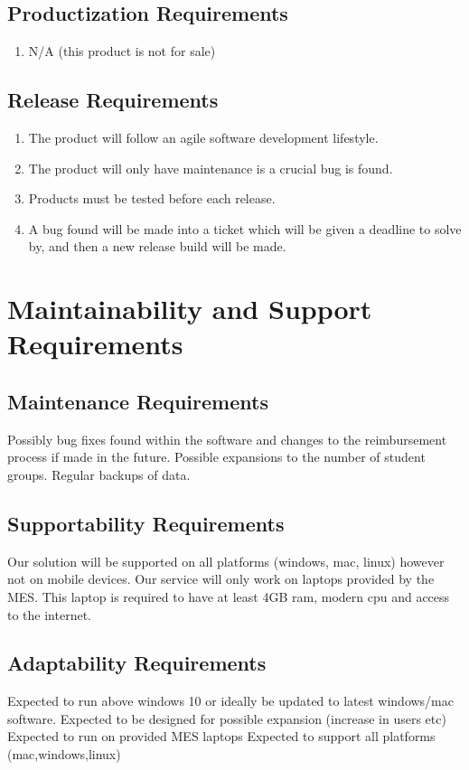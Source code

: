 \documentclass[12pt]{article}
\begin{document}
\subsection{Productization Requirements}
\begin{enumerate}
  \item N/A (this product is not for sale) 
\end{enumerate}
\subsection{Release Requirements}
\begin{enumerate}
  \item The product will follow an agile software development lifestyle.
  \item The product will only have maintenance is a crucial bug is found. 
  \item Products must be tested before each release. 
  \item A bug found will be made into a ticket which will be given a deadline to solve by, and then a new release build will be made.  
\end{enumerate}

\section{Maintainability and Support Requirements}
\subsection{Maintenance Requirements}
Possibly bug fixes found within the software and changes to the reimbursement process if made in the future. Possible expansions to the number of student groups. Regular backups of data.

\subsection{Supportability Requirements}
Our solution will be supported on all platforms (windows, mac, linux) however not on mobile devices. Our service will only work on laptops provided by the MES. This laptop is required to have at least 4GB ram, modern cpu and access to the internet.

\subsection{Adaptability Requirements}
Expected to run above windows 10 or ideally be updated to latest windows/mac software.
Expected to be designed for possible expansion (increase in users etc)
Expected to run on provided MES laptops
Expected to support all platforms (mac,windows,linux)
\end{document}
